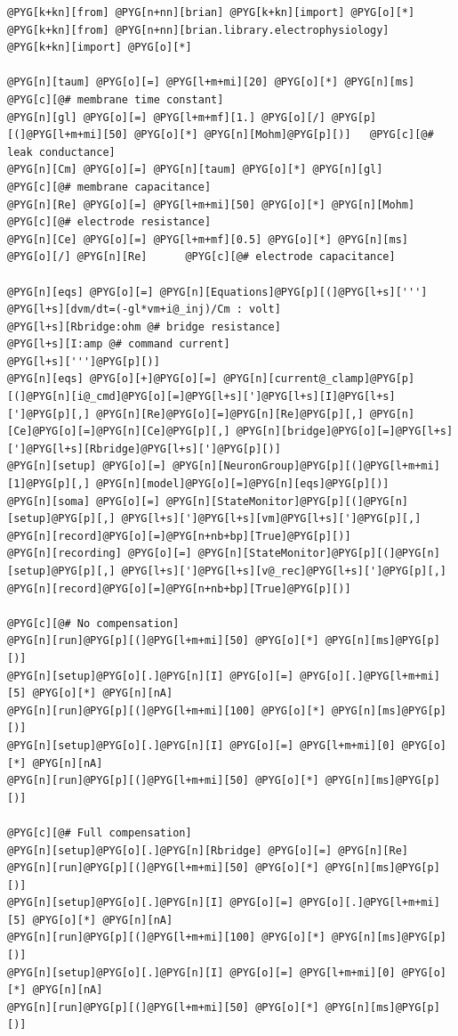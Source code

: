 \documentclass[letterpaper,10pt,english]{manual}
\begin{document}
\begin{Verbatim}[commandchars=@\[\]]
@PYG[k+kn][from] @PYG[n+nn][brian] @PYG[k+kn][import] @PYG[o][*]
@PYG[k+kn][from] @PYG[n+nn][brian.library.electrophysiology] @PYG[k+kn][import] @PYG[o][*]

@PYG[n][taum] @PYG[o][=] @PYG[l+m+mi][20] @PYG[o][*] @PYG[n][ms]        @PYG[c][@# membrane time constant]
@PYG[n][gl] @PYG[o][=] @PYG[l+m+mf][1.] @PYG[o][/] @PYG[p][(]@PYG[l+m+mi][50] @PYG[o][*] @PYG[n][Mohm]@PYG[p][)]   @PYG[c][@# leak conductance]
@PYG[n][Cm] @PYG[o][=] @PYG[n][taum] @PYG[o][*] @PYG[n][gl]        @PYG[c][@# membrane capacitance]
@PYG[n][Re] @PYG[o][=] @PYG[l+m+mi][50] @PYG[o][*] @PYG[n][Mohm]        @PYG[c][@# electrode resistance]
@PYG[n][Ce] @PYG[o][=] @PYG[l+m+mf][0.5] @PYG[o][*] @PYG[n][ms] @PYG[o][/] @PYG[n][Re]      @PYG[c][@# electrode capacitance]

@PYG[n][eqs] @PYG[o][=] @PYG[n][Equations]@PYG[p][(]@PYG[l+s][''']
@PYG[l+s][dvm/dt=(-gl*vm+i@_inj)/Cm : volt]
@PYG[l+s][Rbridge:ohm @# bridge resistance]
@PYG[l+s][I:amp @# command current]
@PYG[l+s][''']@PYG[p][)]
@PYG[n][eqs] @PYG[o][+]@PYG[o][=] @PYG[n][current@_clamp]@PYG[p][(]@PYG[n][i@_cmd]@PYG[o][=]@PYG[l+s][']@PYG[l+s][I]@PYG[l+s][']@PYG[p][,] @PYG[n][Re]@PYG[o][=]@PYG[n][Re]@PYG[p][,] @PYG[n][Ce]@PYG[o][=]@PYG[n][Ce]@PYG[p][,] @PYG[n][bridge]@PYG[o][=]@PYG[l+s][']@PYG[l+s][Rbridge]@PYG[l+s][']@PYG[p][)]
@PYG[n][setup] @PYG[o][=] @PYG[n][NeuronGroup]@PYG[p][(]@PYG[l+m+mi][1]@PYG[p][,] @PYG[n][model]@PYG[o][=]@PYG[n][eqs]@PYG[p][)]
@PYG[n][soma] @PYG[o][=] @PYG[n][StateMonitor]@PYG[p][(]@PYG[n][setup]@PYG[p][,] @PYG[l+s][']@PYG[l+s][vm]@PYG[l+s][']@PYG[p][,] @PYG[n][record]@PYG[o][=]@PYG[n+nb+bp][True]@PYG[p][)]
@PYG[n][recording] @PYG[o][=] @PYG[n][StateMonitor]@PYG[p][(]@PYG[n][setup]@PYG[p][,] @PYG[l+s][']@PYG[l+s][v@_rec]@PYG[l+s][']@PYG[p][,] @PYG[n][record]@PYG[o][=]@PYG[n+nb+bp][True]@PYG[p][)]

@PYG[c][@# No compensation]
@PYG[n][run]@PYG[p][(]@PYG[l+m+mi][50] @PYG[o][*] @PYG[n][ms]@PYG[p][)]
@PYG[n][setup]@PYG[o][.]@PYG[n][I] @PYG[o][=] @PYG[o][.]@PYG[l+m+mi][5] @PYG[o][*] @PYG[n][nA]
@PYG[n][run]@PYG[p][(]@PYG[l+m+mi][100] @PYG[o][*] @PYG[n][ms]@PYG[p][)]
@PYG[n][setup]@PYG[o][.]@PYG[n][I] @PYG[o][=] @PYG[l+m+mi][0] @PYG[o][*] @PYG[n][nA]
@PYG[n][run]@PYG[p][(]@PYG[l+m+mi][50] @PYG[o][*] @PYG[n][ms]@PYG[p][)]

@PYG[c][@# Full compensation]
@PYG[n][setup]@PYG[o][.]@PYG[n][Rbridge] @PYG[o][=] @PYG[n][Re]
@PYG[n][run]@PYG[p][(]@PYG[l+m+mi][50] @PYG[o][*] @PYG[n][ms]@PYG[p][)]
@PYG[n][setup]@PYG[o][.]@PYG[n][I] @PYG[o][=] @PYG[o][.]@PYG[l+m+mi][5] @PYG[o][*] @PYG[n][nA]
@PYG[n][run]@PYG[p][(]@PYG[l+m+mi][100] @PYG[o][*] @PYG[n][ms]@PYG[p][)]
@PYG[n][setup]@PYG[o][.]@PYG[n][I] @PYG[o][=] @PYG[l+m+mi][0] @PYG[o][*] @PYG[n][nA]
@PYG[n][run]@PYG[p][(]@PYG[l+m+mi][50] @PYG[o][*] @PYG[n][ms]@PYG[p][)]


\end{Verbatim}
\end{document}
